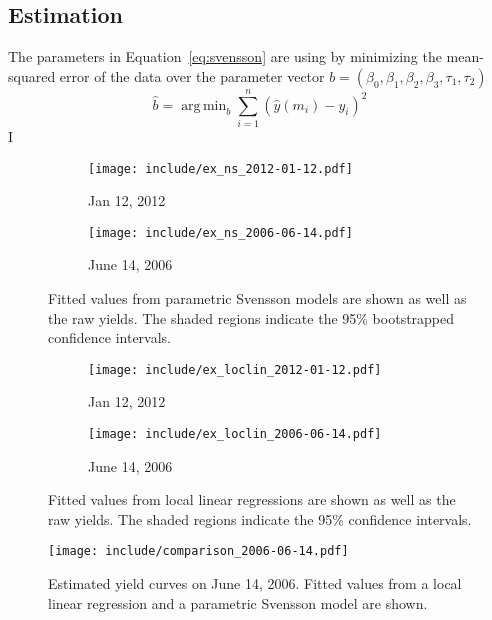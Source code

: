 \documentclass[12pt]{article}
\DeclareMathOperator*{\argmin}{arg\,min}
\begin{document}
\subsection{Estimation}

The parameters in Equation~\ref{eq:svensson} are using by minimizing the mean-squared error of the data over the parameter vector $b = (\beta_0, \beta_1, \beta_2, \beta_3, \tau_1, \tau_2)$
\begin{equation*}
\hat{b} = \argmin_{b} \sum_{i=1}^n \left( \hat{y}(m_i) - y_i \right)^2
\end{equation*}
I


\begin{figure}[htb] \centering
    \begin{subfigure}[t]{.49\linewidth}
        \texttt{[image: include/ex\_ns\_2012-01-12.pdf]}
        \caption{Jan 12, 2012}
    \end{subfigure}
    \begin{subfigure}[t]{.49\linewidth}
        \texttt{[image: include/ex\_ns\_2006-06-14.pdf]}
        \caption{June 14, 2006}
    \end{subfigure}
    \caption{Fitted values from parametric Svensson models are shown as well as the raw yields. The shaded regions indicate the 95\% bootstrapped confidence intervals.}
    \label{fig:ex_ns}
\end{figure}



\begin{figure}[htb] \centering
    \begin{subfigure}[t]{.49\linewidth}
        \texttt{[image: include/ex\_loclin\_2012-01-12.pdf]}
        \caption{Jan 12, 2012}
    \end{subfigure}
    \begin{subfigure}[t]{.49\linewidth}
        \texttt{[image: include/ex\_loclin\_2006-06-14.pdf]}
        \caption{June 14, 2006}
    \end{subfigure}
    \caption{Fitted values from local linear regressions are shown as well as the raw yields. The shaded regions indicate the 95\% confidence intervals.}
    \label{fig:ex_loclin}
\end{figure}



\begin{figure}[htb]
    \centering
    \texttt{[image: include/comparison\_2006-06-14.pdf]}
    \caption{Estimated yield curves on June 14, 2006. Fitted values from a local linear regression and a parametric Svensson model are shown.}
    \label{fig:comparison_bad}
\end{figure}
\end{document}
